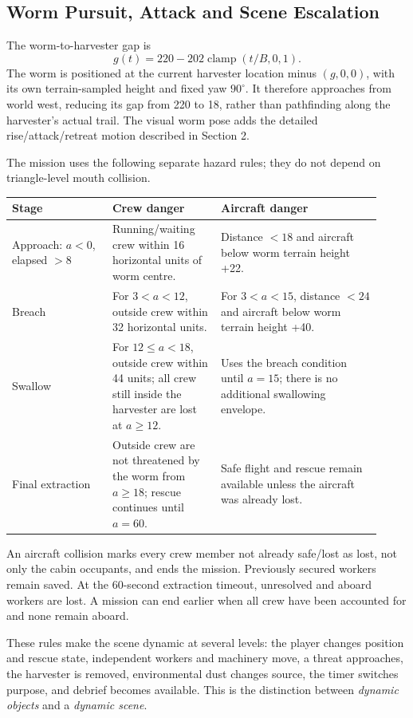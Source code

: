 \subsection{Worm Pursuit, Attack and Scene Escalation}
The worm-to-harvester gap is
\begin{equation}
g(t)=220-202\operatorname{clamp}(t/B,0,1).
\end{equation}
The worm is positioned at the current harvester location minus $(g,0,0)$, with its own terrain-sampled height and fixed yaw $90^\circ$. It therefore approaches from world west, reducing its gap from 220 to 18, rather than pathfinding along the harvester's actual trail. The visual worm pose adds the detailed rise/attack/retreat motion described in Section 2.

The mission uses the following separate hazard rules; they do not depend on triangle-level mouth collision.
\begin{longtable}{L{0.25\linewidth}L{0.27\linewidth}L{0.40\linewidth}}
\toprule\textbf{Stage}&\textbf{Crew danger}&\textbf{Aircraft danger}\\\midrule\endhead
Approach: $a<0$, elapsed $>8$ & Running/waiting crew within 16 horizontal units of worm centre. & Distance $<18$ and aircraft below worm terrain height +22.\\
Breach & For $3<a<12$, outside crew within 32 horizontal units. & For $3<a<15$, distance $<24$ and aircraft below worm terrain height +40.\\
Swallow & For $12\le a<18$, outside crew within 44 units; all crew still inside the harvester are lost at $a\ge12$. & Uses the breach condition until $a=15$; there is no additional swallowing envelope.\\
Final extraction & Outside crew are not threatened by the worm from $a\ge18$; rescue continues until $a=60$. & Safe flight and rescue remain available unless the aircraft was already lost.\\
\bottomrule
\end{longtable}
An aircraft collision marks every crew member not already safe/lost as lost, not only the cabin occupants, and ends the mission. Previously secured workers remain saved. At the 60-second extraction timeout, unresolved and aboard workers are lost. A mission can end earlier when all crew have been accounted for and none remain aboard.

These rules make the scene dynamic at several levels: the player changes position and rescue state, independent workers and machinery move, a threat approaches, the harvester is removed, environmental dust changes source, the timer switches purpose, and debrief becomes available. This is the distinction between \emph{dynamic objects} and a \emph{dynamic scene}.

